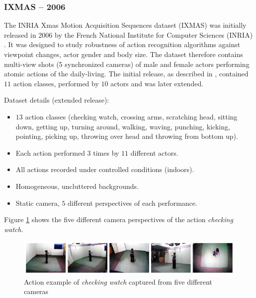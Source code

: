 \subsubsection{IXMAS -- 2006}
The INRIA Xmas Motion Acquisition Sequences dataset (IXMAS) \cite{weinland_free_2006} was initially released in 2006 by the French National Institute for Computer Sciences (INRIA) \cite{weinland_free_2006}.
It was designed to study robustness of action recognition algorithms against viewpoint changes, actor gender and body size.
The dataset therefore contains multi-view shots (5 synchronized cameras) of male and female actors performing atomic actions of the daily-living.
The initial release, as described in \cite{weinland_free_2006}, contained $11$ action classes, performed by $10$ actors and was later extended.

Dataset details (extended release): \cite{_inria_????}
\begin{itemize}
    \item $13$ action classes (checking watch, crossing arms, scratching head, sitting down, getting up, turning around, walking, waving, punching, kicking, pointing, picking up, throwing over head and throwing from bottom up).
    \item Each action performed $3$ times by $11$ different actors.
    \item All actions recorded under controlled conditions (indoors).
    \item Homogeneous, uncluttered backgrounds.
    \item Static camera, $5$ different perspectives of each performance.
\end{itemize}

Figure \ref{fig:ixmas_fiveviews} shows the five different camera perspectives of the action \textit{checking watch}.
%

\begin{figure}[H]
    \centering
    \includegraphics[width=\textwidth]{img_datasets/ixmas_fiveviews}
    \caption{Action example of \textit{checking watch} captured from five different cameras \cite{weinland_free_2006}}
    \label{fig:ixmas_fiveviews}
\end{figure}


